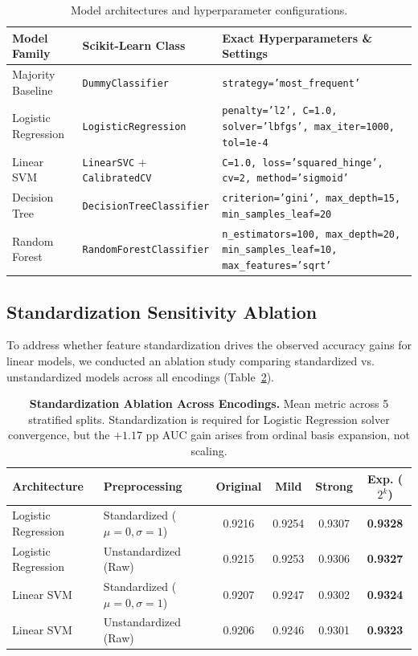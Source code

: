 \documentclass[10pt,a4paper]{article}
\begin{document}
\begin{table}[h]
\centering
\footnotesize
\caption{Model architectures and hyperparameter configurations.}
\label{tab:hyperparams}
\begin{tabularx}{\linewidth}{@{}l l >{\raggedright\arraybackslash}X@{}}
\toprule
\textbf{Model Family} & \textbf{Scikit-Learn Class} & \textbf{Exact Hyperparameters \& Settings} \\
\midrule
Majority Baseline & \texttt{DummyClassifier} & \texttt{strategy='most\_frequent'} \\
Logistic Regression & \texttt{LogisticRegression} & \texttt{penalty='l2', C=1.0, solver='lbfgs', max\_iter=1000, tol=1e-4} \\
Linear SVM & \texttt{LinearSVC} + \texttt{CalibratedCV} & \texttt{C=1.0, loss='squared\_hinge', cv=2, method='sigmoid'} \\
Decision Tree & \texttt{DecisionTreeClassifier} & \texttt{criterion='gini', max\_depth=15, min\_samples\_leaf=20} \\
Random Forest & \texttt{RandomForestClassifier} & \texttt{n\_estimators=100, max\_depth=20, min\_samples\_leaf=10, max\_features='sqrt'} \\
\bottomrule
\end{tabularx}
\end{table}

\subsection{Standardization Sensitivity Ablation}
To address whether feature standardization drives the observed accuracy gains for linear models, we conducted an ablation study comparing standardized vs. unstandardized models across all encodings (Table~\ref{tab:ablation}).

\begin{table}[h]
\centering
\footnotesize
\caption{\textbf{Standardization Ablation Across Encodings.} Mean metric across 5 stratified splits. Standardization is required for Logistic Regression solver convergence, but the $+1.17$ pp AUC gain arises from ordinal basis expansion, not scaling.}
\label{tab:ablation}
\begin{tabular*}{\linewidth}{@{\extracolsep{\fill}}llcccc@{}}
\toprule
\textbf{Architecture} & \textbf{Preprocessing} & \textbf{Original} & \textbf{Mild} & \textbf{Strong} & \textbf{Exp. ($2^k$)} \\
\midrule
Logistic Regression & Standardized ($\mu=0,\sigma=1$) & 0.9216 & 0.9254 & 0.9307 & \textbf{0.9328} \\
Logistic Regression & Unstandardized (Raw) & 0.9215 & 0.9253 & 0.9306 & \textbf{0.9327} \\
\midrule
Linear SVM & Standardized ($\mu=0,\sigma=1$) & 0.9207 & 0.9247 & 0.9302 & \textbf{0.9324} \\
Linear SVM & Unstandardized (Raw) & 0.9206 & 0.9246 & 0.9301 & \textbf{0.9323} \\
\bottomrule
\end{tabular*}
\end{table}
\end{document}

